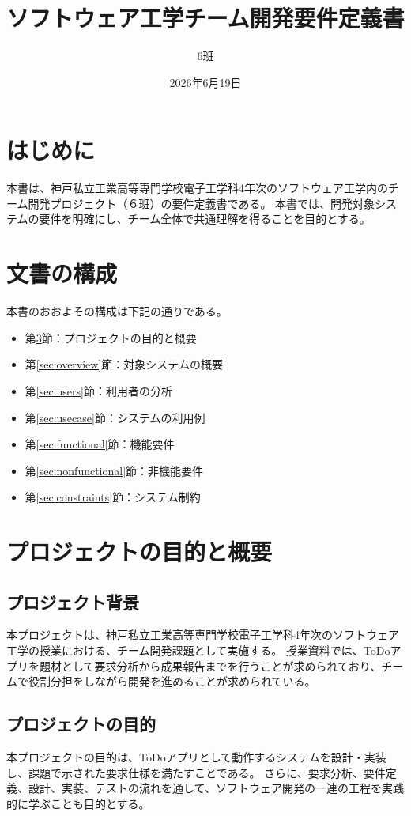 \documentclass[dvipdfmx,10pt]{jarticle}
\title{ソフトウェア工学チーム開発\break 要件定義書}
\author{6班}
\date{2026年6月19日}
\begin{document}
    \maketitle
    \pagebreak
    \tableofcontents
    \pagebreak
    \section{はじめに}
    本書は、神戸私立工業高等専門学校電子工学科4年次のソフトウェア工学内のチーム開発プロジェクト（６班）の要件定義書である。
    本書では、開発対象システムの要件を明確にし、チーム全体で共通理解を得ることを目的とする。
    
    \section{文書の構成}
    本書のおおよその構成は下記の通りである。
    \begin{itemize}
        \item 第\ref{sec:purpose}節：プロジェクトの目的と概要
        \item 第\ref{sec:overview}節：対象システムの概要
        \item 第\ref{sec:users}節：利用者の分析
        \item 第\ref{sec:usecase}節：システムの利用例
        \item 第\ref{sec:functional}節：機能要件
        \item 第\ref{sec:nonfunctional}節：非機能要件
        \item 第\ref{sec:constraints}節：システム制約
    \end{itemize}

    \pagebreak
    
    \section{プロジェクトの目的と概要}
    \label{sec:purpose}
    \subsection{プロジェクト背景}
    本プロジェクトは、神戸私立工業高等専門学校電子工学科4年次のソフトウェア工学の授業における、チーム開発課題として実施する。
    授業資料では、ToDoアプリを題材として要求分析から成果報告までを行うことが求められており、チームで役割分担をしながら開発を進めることが求められている。

    \subsection{プロジェクトの目的}
    本プロジェクトの目的は、ToDoアプリとして動作するシステムを設計・実装し、課題で示された要求仕様を満たすことである。
    さらに、要求分析、要件定義、設計、実装、テストの流れを通して、ソフトウェア開発の一連の工程を実践的に学ぶことも目的とする。
\end{document}
